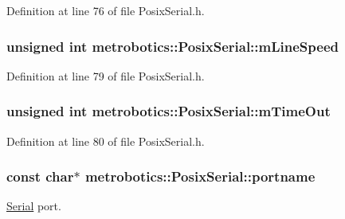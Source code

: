 \-Definition at line 76 of file \-Posix\-Serial.\-h.

\hypertarget{classmetrobotics_1_1PosixSerial_acffca69e71f5ced685bb28f185cdc5b1}{
\subsubsection[{m\-Line\-Speed}]{\setlength{\rightskip}{0pt plus 5cm}unsigned int {\bf metrobotics\-::\-Posix\-Serial\-::m\-Line\-Speed}}}\label{classmetrobotics_1_1PosixSerial_acffca69e71f5ced685bb28f185cdc5b1}


\-Definition at line 79 of file \-Posix\-Serial.\-h.

\hypertarget{classmetrobotics_1_1PosixSerial_a1e7511b3cf4f30f28285ff7a63036a27}{
\subsubsection[{m\-Time\-Out}]{\setlength{\rightskip}{0pt plus 5cm}unsigned int {\bf metrobotics\-::\-Posix\-Serial\-::m\-Time\-Out}}}\label{classmetrobotics_1_1PosixSerial_a1e7511b3cf4f30f28285ff7a63036a27}


\-Definition at line 80 of file \-Posix\-Serial.\-h.

\hypertarget{classmetrobotics_1_1PosixSerial_aebe93bcd27acc075801e3f2e2b274a4e}{
\subsubsection[{portname}]{\setlength{\rightskip}{0pt plus 5cm}const char$\ast$ {\bf metrobotics\-::\-Posix\-Serial\-::portname}}}\label{classmetrobotics_1_1PosixSerial_aebe93bcd27acc075801e3f2e2b274a4e}


\hyperlink{classmetrobotics_1_1Serial}{\-Serial} port. 



